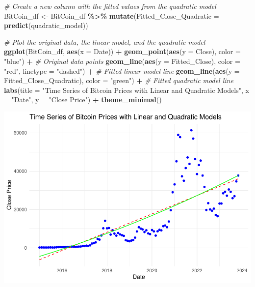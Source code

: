 \documentclass[
]{book}
\newenvironment{Shaded}{\begin{snugshade}}{\end{snugshade}}
\newcommand{\AttributeTok}[1]{\textcolor[rgb]{0.13,0.29,0.53}{#1}}
\newcommand{\CommentTok}[1]{\textcolor[rgb]{0.56,0.35,0.01}{\textit{#1}}}
\newcommand{\FunctionTok}[1]{\textcolor[rgb]{0.13,0.29,0.53}{\textbf{#1}}}
\newcommand{\NormalTok}[1]{#1}
\newcommand{\OtherTok}[1]{\textcolor[rgb]{0.56,0.35,0.01}{#1}}
\newcommand{\SpecialCharTok}[1]{\textcolor[rgb]{0.81,0.36,0.00}{\textbf{#1}}}
\newcommand{\StringTok}[1]{\textcolor[rgb]{0.31,0.60,0.02}{#1}}
\begin{document}
\begin{Shaded}
\begin{Highlighting}[]
\CommentTok{\# Create a new column with the fitted values from the quadratic model}
\NormalTok{BitCoin\_df }\OtherTok{\textless{}{-}}\NormalTok{ BitCoin\_df }\SpecialCharTok{\%\textgreater{}\%}
  \FunctionTok{mutate}\NormalTok{(}\AttributeTok{Fitted\_Close\_Quadratic =} \FunctionTok{predict}\NormalTok{(quadratic\_model))}

\CommentTok{\# Plot the original data, the linear model, and the quadratic model}
\FunctionTok{ggplot}\NormalTok{(BitCoin\_df, }\FunctionTok{aes}\NormalTok{(}\AttributeTok{x =}\NormalTok{ Date)) }\SpecialCharTok{+}
  \FunctionTok{geom\_point}\NormalTok{(}\FunctionTok{aes}\NormalTok{(}\AttributeTok{y =}\NormalTok{ Close), }\AttributeTok{color =} \StringTok{"blue"}\NormalTok{) }\SpecialCharTok{+}  \CommentTok{\# Original data points}
  \FunctionTok{geom\_line}\NormalTok{(}\FunctionTok{aes}\NormalTok{(}\AttributeTok{y =}\NormalTok{ Fitted\_Close), }\AttributeTok{color =} \StringTok{"red"}\NormalTok{, }\AttributeTok{linetype =} \StringTok{"dashed"}\NormalTok{) }\SpecialCharTok{+}  \CommentTok{\# Fitted linear model line}
  \FunctionTok{geom\_line}\NormalTok{(}\FunctionTok{aes}\NormalTok{(}\AttributeTok{y =}\NormalTok{ Fitted\_Close\_Quadratic), }\AttributeTok{color =} \StringTok{"green"}\NormalTok{) }\SpecialCharTok{+}  \CommentTok{\# Fitted quadratic model line}
  \FunctionTok{labs}\NormalTok{(}\AttributeTok{title =} \StringTok{"Time Series of Bitcoin Prices with Linear and Quadratic Models"}\NormalTok{,}
       \AttributeTok{x =} \StringTok{"Date"}\NormalTok{,}
       \AttributeTok{y =} \StringTok{"Close Price"}\NormalTok{) }\SpecialCharTok{+}
  \FunctionTok{theme\_minimal}\NormalTok{()}
\end{Highlighting}
\end{Shaded}

\includegraphics{bookdown-demo_files/figure-latex/unnamed-chunk-33-1.pdf}
\end{document}
